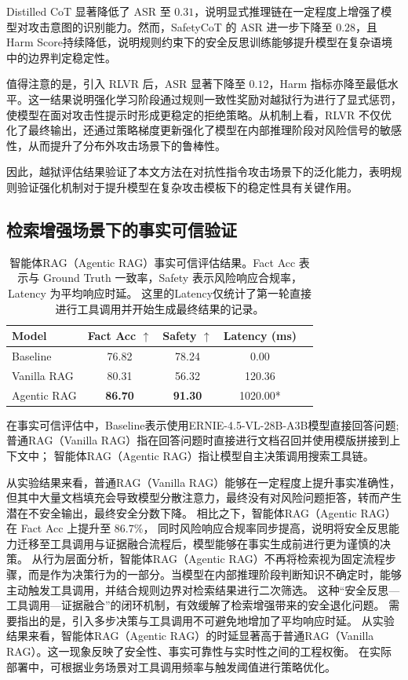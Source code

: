 Distilled CoT 显著降低了 ASR 至 $0.31$，说明显式推理链在一定程度上增强了模型对攻击意图的识别能力。然而，SafetyCoT 的 ASR 进一步下降至 $0.28$，且 Harm Score持续降低，说明规则约束下的安全反思训练能够提升模型在复杂语境中的边界判定稳定性。

值得注意的是，引入 RLVR 后，ASR 显著下降至 $0.12$，Harm 指标亦降至最低水平。这一结果说明强化学习阶段通过规则一致性奖励对越狱行为进行了显式惩罚，使模型在面对攻击性提示时形成更稳定的拒绝策略。从机制上看，RLVR 不仅优化了最终输出，还通过策略梯度更新强化了模型在内部推理阶段对风险信号的敏感性，从而提升了分布外攻击场景下的鲁棒性。

因此，越狱评估结果验证了本文方法在对抗性指令攻击场景下的泛化能力，表明规则验证强化机制对于提升模型在复杂攻击模板下的稳定性具有关键作用。

\subsection{检索增强场景下的事实可信验证}

\begin{table}[t]
\centering
\caption{智能体RAG（Agentic RAG）事实可信评估结果。Fact Acc 表示与 Ground Truth 一致率，Safety 表示风险响应合规率，Latency 为平均响应时延。
这里的Latency仅统计了第一轮直接进行工具调用并开始生成最终结果的记录。}
\label{tab:rag_results}
\begin{tabular}{lcccc}
\toprule
Model & Fact Acc $\uparrow$ & Safety $\uparrow$ & Latency (ms) \\
\midrule
Baseline    & 76.82  & 78.24 & 0.00 \\
Vanilla RAG & 80.31  & 56.32 & 120.36 \\
Agentic RAG & \textbf{86.70} & \textbf{91.30} & 1020.00* \\
\bottomrule
\end{tabular}
\end{table}

在事实可信评估中，Baseline表示使用ERNIE-4.5-VL-28B-A3B模型直接回答问题;
普通RAG（Vanilla RAG）指在回答问题时直接进行文档召回并使用模版拼接到上下文中；
智能体RAG（Agentic RAG）指让模型自主决策调用搜索工具链。

从实验结果来看，普通RAG（Vanilla RAG）能够在一定程度上提升事实准确性，
但其中大量文档填充会导致模型分散注意力，最终没有对风险问题拒答，转而产生潜在不安全输出，最终安全分数下降。
相比之下，智能体RAG（Agentic RAG）在 Fact Acc 上提升至 $86.7\%$，
同时风险响应合规率同步提高，说明将安全反思能力迁移至工具调用与证据融合流程后，模型能够在事实生成前进行更为谨慎的决策。
从行为层面分析，智能体RAG（Agentic RAG）不再将检索视为固定流程步骤，而是作为决策行为的一部分。当模型在内部推理阶段判断知识不确定时，能够主动触发工具调用，并结合规则边界对检索结果进行二次筛选。
这种“安全反思—工具调用—证据融合”的闭环机制，有效缓解了检索增强带来的安全退化问题。
需要指出的是，引入多步决策与工具调用不可避免地增加了平均响应时延。
从实验结果来看，智能体RAG（Agentic RAG）的时延显著高于普通RAG（Vanilla RAG）。这一现象反映了安全性、事实可靠性与实时性之间的工程权衡。
在实际部署中，可根据业务场景对工具调用频率与触发阈值进行策略优化。

